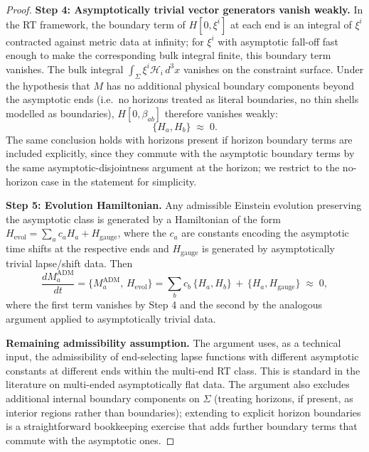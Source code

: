 \documentclass[aps,prd,onecolumn,nofootinbib,superscriptaddress]{revtex4-2}
\begin{document}
\begin{proof}
\textbf{Step 4: Asymptotically trivial vector generators vanish weakly.} In the RT framework, the boundary term of $H[0, \xi^i]$ at each end is an integral of $\xi^i$ contracted against metric data at infinity; for $\xi^i$ with asymptotic fall-off fast enough to make the corresponding bulk integral finite, this boundary term vanishes. The bulk integral $\int_\Sigma \xi^i \mathcal{H}_i \, d^3x$ vanishes on the constraint surface. Under the hypothesis that $M$ has no additional physical boundary components beyond the asymptotic ends (i.e.\ no horizons treated as literal boundaries, no thin shells modelled as boundaries), $H[0, \beta_{ab}]$ therefore vanishes weakly:
\begin{equation}
\{H_a, H_b\} \;\approx\; 0.
\end{equation}
The same conclusion holds with horizons present if horizon boundary terms are included explicitly, since they commute with the asymptotic boundary terms by the same asymptotic-disjointness argument at the horizon; we restrict to the no-horizon case in the statement for simplicity.

\textbf{Step 5: Evolution Hamiltonian.} Any admissible Einstein evolution preserving the asymptotic class is generated by a Hamiltonian of the form $H_{\mathrm{evol}} = \sum_a c_a H_a + H_{\mathrm{gauge}}$, where the $c_a$ are constants encoding the asymptotic time shifts at the respective ends and $H_{\mathrm{gauge}}$ is generated by asymptotically trivial lapse/shift data.\cite{ReggeTeitelboim1974SurfaceIntegrals} Then
\begin{equation}
\frac{dM_a^{\mathrm{ADM}}}{dt}
= \{M_a^{\mathrm{ADM}},\, H_{\mathrm{evol}}\}
= \sum_b c_b\, \{H_a, H_b\}\,+\,\{H_a, H_{\mathrm{gauge}}\}
\;\approx\; 0,
\end{equation}
where the first term vanishes by Step 4 and the second by the analogous argument applied to asymptotically trivial data.

\textbf{Remaining admissibility assumption.} The argument uses, as a technical input, the admissibility of end-selecting lapse functions with different asymptotic constants at different ends within the multi-end RT class. This is standard in the literature on multi-ended asymptotically flat data.\cite{ReggeTeitelboim1974SurfaceIntegrals,Chrusciel2020ConstraintEquations} The argument also excludes additional internal boundary components on $\Sigma$ (treating horizons, if present, as interior regions rather than boundaries); extending to explicit horizon boundaries is a straightforward bookkeeping exercise that adds further boundary terms that commute with the asymptotic ones.
\end{proof}
\end{document}
